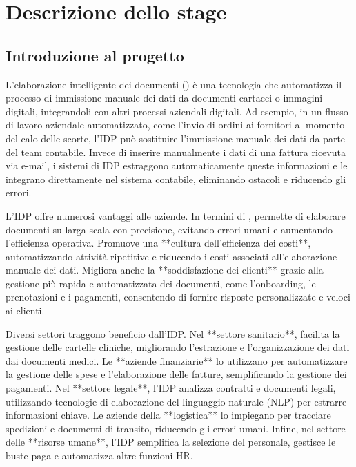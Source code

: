 
\chapter{Descrizione dello stage}
\label{cap:descrizione-stage}


\section{Introduzione al progetto}

L'elaborazione intelligente dei documenti () è una tecnologia che automatizza il processo di immissione manuale dei dati da documenti cartacei o immagini digitali, integrandoli con altri processi aziendali digitali. Ad esempio, in un flusso di lavoro aziendale automatizzato, come l'invio di ordini ai fornitori al momento del calo delle scorte, l'IDP può sostituire l'immissione manuale dei dati da parte del team contabile. Invece di inserire manualmente i dati di una fattura ricevuta via e-mail, i sistemi di IDP estraggono automaticamente queste informazioni e le integrano direttamente nel sistema contabile, eliminando ostacoli e riducendo gli errori.

L'IDP offre numerosi vantaggi alle aziende. In termini di , permette di elaborare documenti su larga scala con precisione, evitando errori umani e aumentando l'efficienza operativa. Promuove una **cultura dell’efficienza dei costi**, automatizzando attività ripetitive e riducendo i costi associati all'elaborazione manuale dei dati. Migliora anche la **soddisfazione dei clienti** grazie alla gestione più rapida e automatizzata dei documenti, come l'onboarding, le prenotazioni e i pagamenti, consentendo di fornire risposte personalizzate e veloci ai clienti.

Diversi settori traggono beneficio dall'IDP. Nel **settore sanitario**, facilita la gestione delle cartelle cliniche, migliorando l'estrazione e l'organizzazione dei dati dai documenti medici. Le **aziende finanziarie** lo utilizzano per automatizzare la gestione delle spese e l'elaborazione delle fatture, semplificando la gestione dei pagamenti. Nel **settore legale**, l'IDP analizza contratti e documenti legali, utilizzando tecnologie di elaborazione del linguaggio naturale (NLP) per estrarre informazioni chiave. Le aziende della **logistica** lo impiegano per tracciare spedizioni e documenti di transito, riducendo gli errori umani. Infine, nel settore delle **risorse umane**, l'IDP semplifica la selezione del personale, gestisce le buste paga e automatizza altre funzioni HR.

